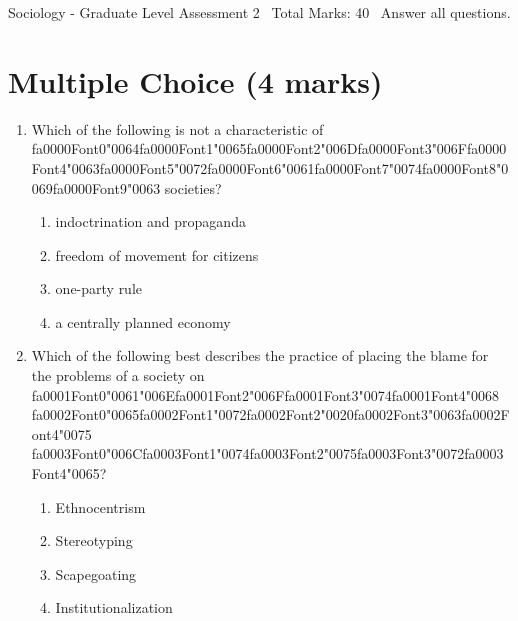\documentclass[12pt]{article}
\begin{document}
\begin{center}
Sociology - Graduate Level Assessment 2 \
Total Marks: 40 \
Answer all questions.
\end{center}

\section*{Multiple Choice (4 marks)}
\begin{enumerate}[label=\arabic*.]
\item Which of the following is not a characteristic of {\csname fa0000Font0\endcsname\char"0064}{\csname fa0000Font1\endcsname\char"0065}{\csname fa0000Font2\endcsname\char"006D}{\csname fa0000Font3\endcsname\char"006F}{\csname fa0000Font4\endcsname\char"0063}{\csname fa0000Font5\endcsname\char"0072}{\csname fa0000Font6\endcsname\char"0061}{\csname fa0000Font7\endcsname\char"0074}{\csname fa0000Font8\endcsname\char"0069}{\csname fa0000Font9\endcsname\char"0063} societies?
\begin{enumerate}[label=(\alph*)]
    \item indoctrination and propaganda
    \item freedom of movement for citizens
    \item one-party rule
    \item a centrally planned economy
\end{enumerate}
\item Which of the following best describes the practice of placing the blame for the problems of a society on {\csname fa0001Font0\endcsname\char"0061}{\char"006E}{\csname fa0001Font2\endcsname\char"006F}{\csname fa0001Font3\endcsname\char"0074}{\csname fa0001Font4\endcsname\char"0068} {\csname fa0002Font0\endcsname\char"0065}{\csname fa0002Font1\endcsname\char"0072}{\csname fa0002Font2\endcsname\char"0020}{\csname fa0002Font3\endcsname\char"0063}{\csname fa0002Font4\endcsname\char"0075} {\csname fa0003Font0\endcsname\char"006C}{\csname fa0003Font1\endcsname\char"0074}{\csname fa0003Font2\endcsname\char"0075}{\csname fa0003Font3\endcsname\char"0072}{\csname fa0003Font4\endcsname\char"0065}?
\begin{enumerate}[label=(\alph*)]
    \item Ethnocentrism
    \item Stereotyping
    \item Scapegoating
    \item Institutionalization
\end{enumerate}
\end{enumerate}
\end{document}

